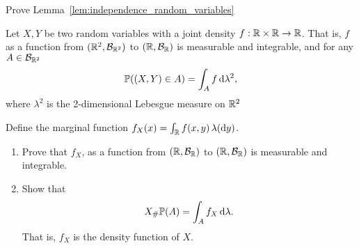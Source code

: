 \begin{problem}\label{prb:independence_random_variables}
Prove Lemma~\ref{lem:independence_random_variables}
\end{problem}

\begin{problem}
Let $X,Y$ be two random variables with a joint density $f : \mathbb R \times \mathbb R \to \mathbb R$. That is, $f$ as a function from $(\mathbb R^2, \mathcal B_{\mathbb R^2})$ to $(\mathbb R, \mathcal B_{\mathbb R})$ is measurable and integrable, and for any $A \in \mathcal B_{\mathbb R^2}$
\[
	\mathbb P((X,Y) \in A) = \int_A f \, \mathrm{d} \lambda^2,
\]
where $\lambda^2$ is the 2-dimensional Lebesgue measure on $\mathbb R^2$

Define the marginal function $f_X(x) = \int_{\mathbb R} f(x,y) \, \lambda(\mathrm{d} y)$.
\begin{enumerate}[label={(\alph*)}]
\item Prove that $f_X$, as a function from $(\mathbb R, \mathcal B_{\mathbb R})$ to $(\mathbb R, \mathcal B_{\mathbb R})$ is measurable and integrable.
\item Show that
\[
	X_\# \mathbb P (A) = \int_A f_X \, \mathrm{d} \lambda.
\]
That is, $f_X$ is the density function of $X$.
\end{enumerate}
\end{problem}